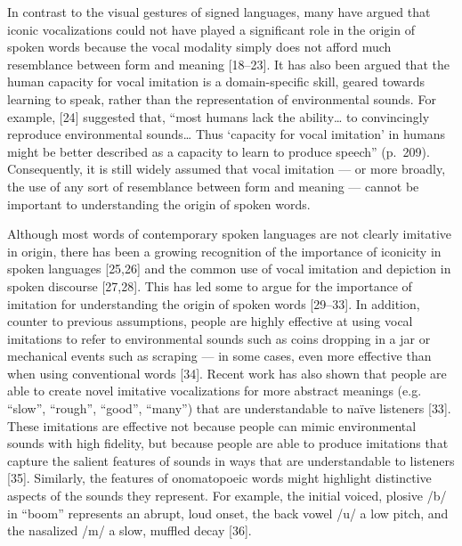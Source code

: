 \documentclass[english,floatsintext,man]{apa6}
\theoremstyle{definition}
\theoremstyle{definition}
\theoremstyle{definition}
\theoremstyle{remark}
\begin{document}
In contrast to the visual gestures of signed languages, many have argued
that iconic vocalizations could not have played a significant role in
the origin of spoken words because the vocal modality simply does not
afford much resemblance between form and meaning {[}18--23{]}. It has
also been argued that the human capacity for vocal imitation is a
domain-specific skill, geared towards learning to speak, rather than the
representation of environmental sounds. For example, {[}24{]} suggested
that, \enquote{most humans lack the ability\ldots{} to convincingly
reproduce environmental sounds\ldots{} Thus \enquote{capacity for vocal
imitation} in humans might be better described as a capacity to learn to
produce speech} (p.~209). Consequently, it is still widely assumed that
vocal imitation --- or more broadly, the use of any sort of resemblance
between form and meaning --- cannot be important to understanding the
origin of spoken words.

Although most words of contemporary spoken languages are not clearly
imitative in origin, there has been a growing recognition of the
importance of iconicity in spoken languages {[}25,26{]} and the common
use of vocal imitation and depiction in spoken discourse {[}27,28{]}.
This has led some to argue for the importance of imitation for
understanding the origin of spoken words {[}29--33{]}. In addition,
counter to previous assumptions, people are highly effective at using
vocal imitations to refer to environmental sounds such as coins dropping
in a jar or mechanical events such as scraping --- in some cases, even
more effective than when using conventional words {[}34{]}. Recent work
has also shown that people are able to create novel imitative
vocalizations for more abstract meanings (e.g. \enquote{slow},
\enquote{rough}, \enquote{good}, \enquote{many}) that are understandable
to naïve listeners {[}33{]}. These imitations are effective not because
people can mimic environmental sounds with high fidelity, but because
people are able to produce imitations that capture the salient features
of sounds in ways that are understandable to listeners {[}35{]}.
Similarly, the features of onomatopoeic words might highlight
distinctive aspects of the sounds they represent. For example, the
initial voiced, plosive /b/ in \enquote{boom} represents an abrupt, loud
onset, the back vowel /u/ a low pitch, and the nasalized /m/ a slow,
muffled decay {[}36{]}.
\end{document}
